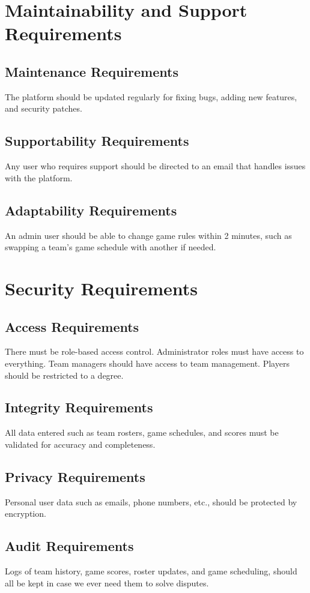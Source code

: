 \documentclass[12pt]{article}
\begin{document}
\section{Maintainability and Support Requirements}
\subsection{Maintenance Requirements}
The platform should be updated regularly for fixing bugs, adding new features, and security patches.

\subsection{Supportability Requirements}
Any user who requires support should be directed to an email that handles issues with the platform.

\subsection{Adaptability Requirements}
An admin user should be able to change game rules within 2 minutes, such as swapping a team’s game schedule with another if needed.

\section{Security Requirements}
\subsection{Access Requirements}
There must be role-based access control. Administrator roles must have access to everything. Team managers should have access to team management. Players should be restricted to a degree.

\subsection{Integrity Requirements}
All data entered such as team rosters, game schedules, and scores must be validated for accuracy and completeness.

\subsection{Privacy Requirements}
Personal user data such as emails, phone numbers, etc., should be protected by encryption.

\subsection{Audit Requirements}
Logs of team history, game scores, roster updates, and game scheduling, should all be kept in case we ever need them to solve disputes.
\end{document}
